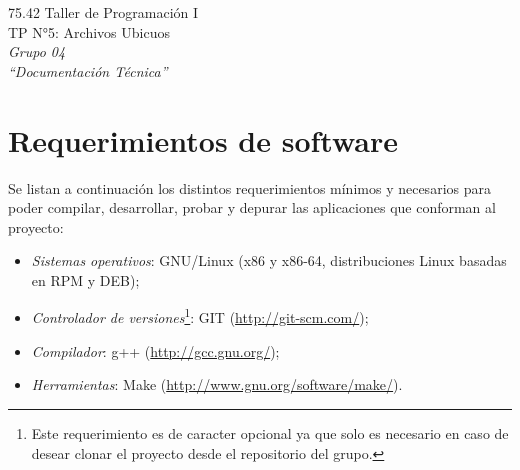 \documentclass{article}
\begin{document}
\setcounter{page}{5}



\begin{titlepage}
	\vspace*{\fill}
	\begin{center}
		\Large 75.42 Taller de Programación I \\
		\Huge TP N°5: Archivos Ubicuos \\
		\bigskip\huge\textit{Grupo 04} \\
		\bigskip\bigskip\bigskip\bigskip\bigskip\bigskip
		\bigskip\bigskip\bigskip\bigskip\bigskip\bigskip\bigskip
		\medskip\huge\textit{``Documentación Técnica''} \\
		\date{}
	\end{center}
	\vspace*{\fill}
\end{titlepage}
\newpage




\tableofcontents
\newpage
{}




\section{Requerimientos de software}
	
	Se listan a continuación los distintos requerimientos mínimos y necesarios para poder compilar, desarrollar, probar y depurar las aplicaciones que conforman al proyecto:
	\medskip

	\begin{itemize}
	\itemsep=5pt \topsep=0pt \partopsep=0pt \parskip=0pt \parsep=0pt

		\item \textit{Sistemas operativos}: GNU/Linux (x86 y x86-64, distribuciones Linux basadas en RPM y DEB);

		\item \textit{Controlador de versiones}\footnote{Este requerimiento es de caracter opcional ya que solo es necesario en caso de desear clonar el proyecto desde el repositorio del grupo.}: GIT (\url{http://git-scm.com/});

		\item \textit{Compilador}: g++ (\url{http://gcc.gnu.org/});

		\item \textit{Herramientas}: Make (\url{http://www.gnu.org/software/make/}).

	\end{itemize}
\bigskip
\end{document}
